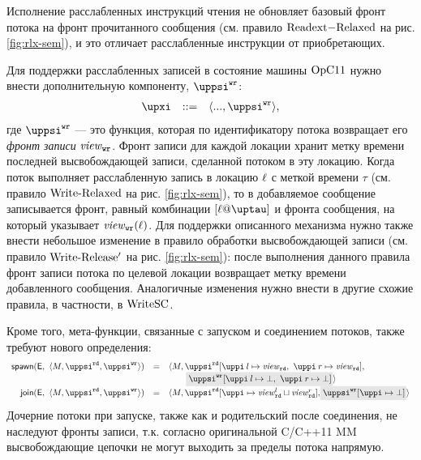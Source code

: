 Исполнение расслабленных инструкций чтения не обновляет
базовый фронт потока на фронт прочитанного сообщения
(см. правило ${\rm Read	ext{-}Relaxed}$ на рис. \ref{fig:rlx-sem}), и это отличает
расслабленные инструкции от приобретающих.

Для поддержки расслабленных записей в состояние машины $\mathrm{OpC11}$ нужно внести дополнительную компоненту, $\stPsiWrite$:
%
\[\begin{array}{rcl}
\auxX      & ::= & \angled{..., \stPsiWrite},
\end{array}\]
%
где $\stPsiWrite$ --- это функция, которая по идентификатору потока возвращает его \emph{фронт записи} $\mathit{view}_{\text{\scriptsize{\texttt{wr}}}}$.
Фронт записи для каждой локации хранит метку времени последней высвобождающей записи, сделанной потоком в эту локацию.
Когда поток выполняет расслабленную запись в локацию $\ell$ с меткой времени $\tau$
(см. правило ${\rm Write\text{-}Relaxed}$ на рис. \ref{fig:rlx-sem}),
то в добавляемое сообщение записывается фронт, равный комбинации $[\loc@\tau]$ и фронта сообщения, на который указывает
$\mathit{view}_{\text{\scriptsize{\texttt{wr}}}}(\ell)$.
Для поддержки описанного механизма нужно также внести небольшое изменение в правило обработки высвобождающей записи
(см. правило ${\rm Write\text{-}Release'}$ на рис. \ref{fig:rlx-sem}): после выполнения данного правила фронт записи потока
по целевой локации возвращает метку времени добавленного сообщения. Аналогичные изменения нужно внести в другие
схожие правила, в частности, в ${\rm WriteSC}$.

Кроме того, мета-функции, связанные с запуском и соединением потоков, также требуют нового определения:
\[
\begin{array}{r c l}
\spawn{\EvalContext}{\angled{\stEta,\stPsiRead,\stPsiWrite}} & = &
\angled{\stEta,
\stPsiRead[\stpath\:l \mapsto \stSigmaRead,~\stpath\:r \mapsto \stSigmaRead], \\
& & \quad ~~~ \graybox{\stPsiWrite[\stpath\:l \mapsto \bot,~\stpath\:r \mapsto \bot]}} \\

\joinP{\EvalContext}{\angled{\stEta, \stPsiRead, \stPsiWrite}} & = &
\angled{\stEta, \stPsiRead[\stpath \mapsto \stSigmaRead^{l} \sqcup \stSigmaRead^{r}],
  \graybox{\stPsiWrite[\stpath \mapsto \bot]}}
\end{array}
\]
Дочерние потоки при запуске, также как и родительский после соединения, не наследуют
фронты записи, т.к. согласно оригинальной C/C++11 MM~\cite{Batty-al:POPL11}
высвобождающие цепочки не могут выходить за пределы потока напрямую.

